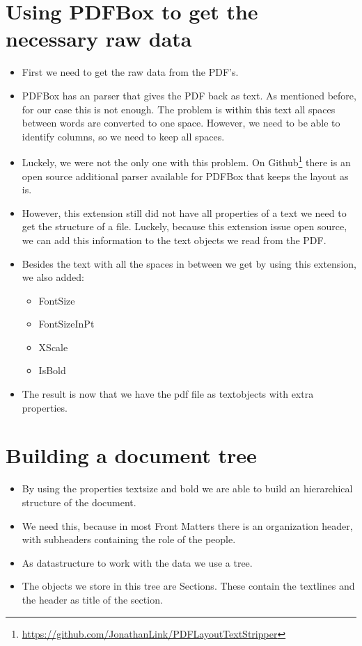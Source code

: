 \documentclass{ou-report}
\begin{document}
\section{Using PDFBox to get the necessary raw data}
\begin{itemize}
    \item First we need to get the raw data from the PDF's.
    \item PDFBox has an parser that gives the PDF back as text. As mentioned
        before, for our case this is not enough. The problem is within this text
        all spaces between words are converted to one space. However, we need to
        be able to identify columns, so we need to keep all spaces.
    \item Luckely, we were not the only one with this problem. On 
        Github\footnote{\url{https://github.com/JonathanLink/PDFLayoutTextStripper}} 
        there is an open source additional parser available for PDFBox that 
        keeps the layout as is.
    \item However, this extension still did not have all properties of a text we
        need to get the structure of a file. Luckely, because this extension 
        issue open source, we can add this information to the text objects we 
        read from the PDF.
    \item Besides the text with all the spaces in between we get by using this 
        extension, we also added:
    \begin{itemize}
        \item FontSize
        \item FontSizeInPt
        \item XScale
        \item IsBold
    \end{itemize}
    \item The result is now that we have the pdf file as textobjects with 
        extra properties.
\end{itemize}

\section{Building a document tree}
\label{sec:lncs_parser_doc_tree}
\begin{itemize}
    \item By using the properties textsize and bold we are able to build an 
        hierarchical structure of the document. 
    \item We need this, because in most
        Front Matters there is an organization header, with subheaders 
        containing the role of the people.
    \item As datastructure to work with the data we use a tree.
    \item The objects we store in this tree are Sections. These contain the 
        textlines and the header as title of the section.
\end{itemize}
\end{document}
